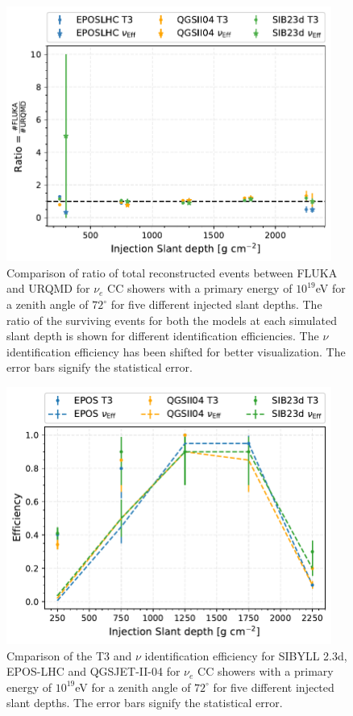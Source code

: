 \begin{figure}[t!]
  \centering
  \includegraphics[width=0.95\textwidth]{thesis_figures/App2/Efficiency_vs_slant_comp_FLUKAnURQMD.pdf}
  \caption{Comparison of ratio of total reconstructed events between FLUKA and URQMD for $\nu_e$ CC showers with a primary energy of $10^{19}$eV for a zenith angle of $72^\circ$ for five different injected slant depths. The ratio of the surviving events for both the models at each simulated slant depth is shown for different identification efficiencies. The $\nu$ identification efficiency has been shifted for better visualization. The error bars signify the statistical error.}
  \label{fig:Efficiency_vs_slant_comp_FLUKAnURQMD}
\end{figure}

\begin{figure}[h!]
  \centering
  \includegraphics[width=0.95\textwidth]{thesis_figures/App2/Efficiency_vs_slant_comp_all_HModel.pdf}
  \caption{Cmparison of the T3 and $\nu$ identification efficiency for SIBYLL 2.3d, EPOS-LHC and QGSJET-II-04 for $\nu_e$ CC showers with a primary energy of $10^{19}$eV for a zenith angle of $72^\circ$ for five different injected slant depths. The error bars signify the statistical error.}
  \label{fig:Eff_vs_slant_comp_all_HModels}
\end{figure}


